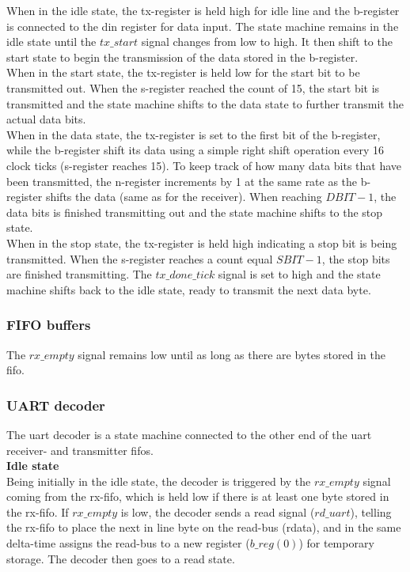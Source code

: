 \documentclass[main.tex]{subfiles}
\begin{document}
When in the idle state, the tx-register is held high for idle line and the b-register is connected to the din register for data input. The state machine remains in the idle state until the $tx\_start$ signal changes from low to high. It then shift to the start state to begin the transmission of the data stored in the b-register. \\

When in the start state, the tx-register is held low for the start bit to be transmitted out. When the s-register reached the count of 15, the start bit is transmitted and the state machine shifts to the data state to further transmit the actual data bits.\\

When in the data state, the tx-register is set to the first bit of the b-register, while the b-register shift its data using a simple right shift operation every 16 clock ticks (s-register reaches 15). To keep track of how many data bits that have been transmitted, the n-register increments by 1 at the same rate as the b-register shifts the data (same as for the receiver). When reaching $DBIT-1$, the data bits is finished transmitting out and the state machine shifts to the stop state.\\

When in the stop state, the tx-register is held high indicating a stop bit is being transmitted. When the s-register reaches a count equal $SBIT - 1$, the stop bits are finished transmitting. The $tx\_done\_tick$ signal is set to high and the state machine shifts back to the idle state, ready to transmit the next data byte.


\subsubsection{FIFO buffers}
The $rx\_empty$ signal remains low until as long as there are bytes stored in the \gls{fifo}.  

\subsubsection{UART decoder}
The \gls{uart} decoder is a state machine connected to the other end of the \gls{uart} receiver- and transmitter \glspl{fifo}. \\

\textbf{Idle state}\\
Being initially in the idle state, the decoder is triggered by the $rx\_empty$ signal coming from the rx-fifo, which is held low if there is at least one byte stored in the rx-fifo. If $rx\_empty$ is low, the decoder sends a read signal ($rd\_uart$), telling the rx-fifo to place the next in line byte on the read-bus (rdata), and in the same delta-time assigns the read-bus to a new register ($b\_reg(0)$) for temporary storage. The decoder then goes to a read state.\\
\end{document}

